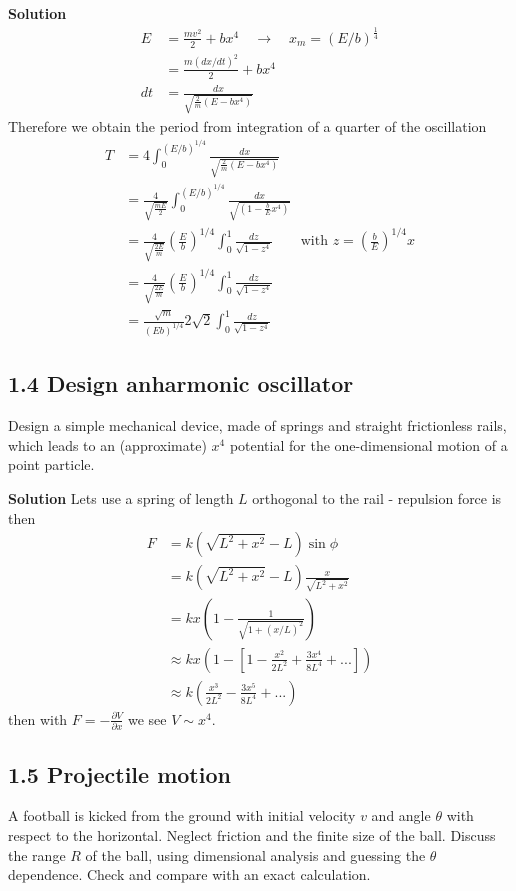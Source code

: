 \documentclass[10pt,a4paper]{book}
\theoremstyle{definition}
\begin{document}
{\bf Solution\newline}
\begin{align}
E&=\frac{mv^2}{2}+bx^4\quad\rightarrow\quad x_{m}=(E/b)^\frac{1}{4}\\
&=\frac{m(dx/dt)^2}{2}+bx^4\\
dt&=\frac{dx}{\sqrt{\frac{2}{m}(E-bx^4)}}
\end{align}
Therefore we obtain the period from integration of a quarter of the oscillation
\begin{align}
T
&=4\int_0^{(E/b)^{1/4}}\frac{dx}{\sqrt{\frac{2}{m}(E-bx^4)}}\\
&=\frac{4}{\sqrt{\frac{mE}{2}}}\int_0^{(E/b)^{1/4}}\frac{dx}{\sqrt{(1-\frac{b}{E}x^4)}}\\
&=\frac{4}{\sqrt{\frac{2E}{m}}}\left(\frac{E}{b}\right)^{1/4}\int_0^1\frac{dz}{\sqrt{1-z^4}}\qquad \text{with } z=\left(\frac{b}{E}\right)^{1/4}x\\
&=\frac{4}{\sqrt{\frac{2E}{m}}}\left(\frac{E}{b}\right)^{1/4}\int_0^1\frac{dz}{\sqrt{1-z^4}}\\
&=\frac{\sqrt{m}}{(Eb)^{1/4}}2\sqrt{2}\int_0^1\frac{dz}{\sqrt{1-z^4}}
\end{align}

\subsection{1.4 Design anharmonic oscillator}
Design a simple mechanical device, made of springs and straight frictionless rails, which leads to an (approximate) $x^4$ potential for the one-dimensional motion of a point particle.

{\bf Solution\newline}
Lets use a spring of length $L$ orthogonal to the rail - repulsion force is then
\begin{align}
F&=k\left(\sqrt{L^2+x^2}-L\right)\sin\phi\\
&=k\left(\sqrt{L^2+x^2}-L\right)\frac{x}{\sqrt{L^2+x^2}}\\
&=kx\left(1-\frac{1}{\sqrt{1+(x/L)^2}}\right)\\
&\approx kx\left(1-\left[1-\frac{x^2}{2L^2}+\frac{3x^4}{8L^4}+...\right]\right)\\
&\approx k\left(\frac{x^3}{2L^2}-\frac{3x^5}{8L^4}+...\right)
\end{align}
then with $F=-\frac{\partial V}{\partial x}$ we see $V\sim x^4$.

\subsection{1.5 Projectile motion}
A football is kicked from the ground with initial velocity $v$ and angle $\theta$ with respect to the horizontal. Neglect friction and the finite size of the ball. Discuss the range $R$ of the ball, using dimensional analysis and guessing the $\theta$ dependence. Check and compare with an exact calculation.
\end{document}
